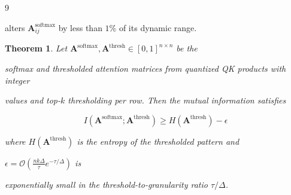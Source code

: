 \documentclass[11pt]{article}
\newtheorem{theorem}{Theorem}[section]
\theoremstyle{definition}
\begin{document}
\begin{thebibliography}{9}
{{{alters $\mathbf{A}^{\text{softmax}}_{ij}$ by less than $1\%$ of its dynamic range.













\begin{theorem}






Let $\mathbf{A}^{\text{softmax}}, \mathbf{A}^{\text{thresh}} \in [0,1]^{n \times n}$ be the






softmax and thresholded attention matrices from quantized QK products with integer






values and top-$k$ thresholding per row. Then the mutual information satisfies






$$






I(\mathbf{A}^{\text{softmax}}; \mathbf{A}^{\text{thresh}}) \geq H(\mathbf{A}^{\text{thresh}}) - \epsilon






$$






where $H(\mathbf{A}^{\text{thresh}})$ is the entropy of the thresholded pattern and






$\epsilon = \mathcal{O}\left( \frac{n k \Delta}{\tau} e^{-\tau / \Delta} \right)$ is






exponentially small in the threshold-to-granularity ratio $\tau / \Delta$.






\end{theorem}













}}}
\end{thebibliography}
\end{document}
